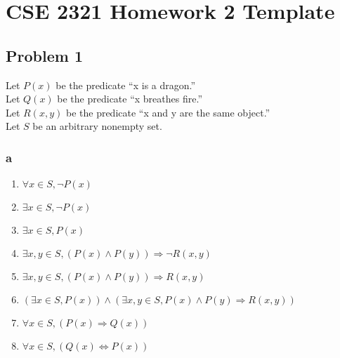 \documentclass[14pt]{extarticle}
\begin{document}
\section*{CSE 2321 Homework 2 Template}


%
%
%
%

\subsection*{Problem 1}
Let $P(x)$ be the predicate ``x is a dragon.''\\
Let $Q(x)$ be the predicate ``x breathes fire.''\\
Let $R(x, y)$ be the predicate ``x and y are the same object.''\\
Let $S$ be an arbitrary nonempty set.

\subsubsection*{a}
\begin{enumerate}[i]
\item $\forall x \in S, \neg P(x)$
\item $\exists x \in S, \neg P(x)$
\item $\exists x \in S, P(x) $
\item $ \exists x, y \in S, (P(x) \land P(y)) \Rightarrow \neg R(x,y) $
\item $ \exists x, y \in S, (P(x) \land P(y)) \Rightarrow R(x,y) $
\item $ (\exists x \in S, P(x)) \land (\exists x, y \in S, P(x) \land P(y) \Rightarrow R(x,y))$
\item $\forall x \in S, (P(x) \Rightarrow Q(x)) $
\item $\forall x \in S, (Q(x) \iff P(x)) $


\end{enumerate}
\end{document}
